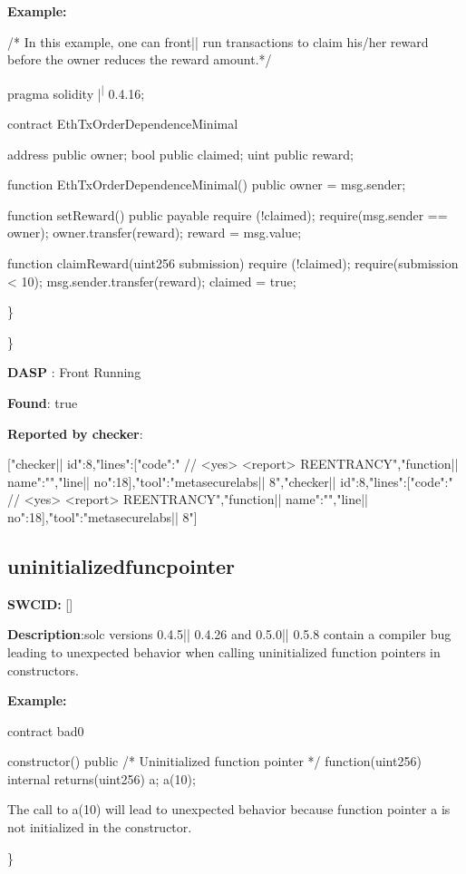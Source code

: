 \documentclass{article}
\begin{document}
\textbf{Example:} 
\begin{ffcode} 

/* In this example, one can front|\textendash| run transactions to claim his/her reward before the owner reduces the reward amount.*/ 

pragma solidity |\textsuperscript| 0.4.16;

contract EthTxOrderDependenceMinimal {
    address public owner;
    bool public claimed;
    uint public reward;

    function EthTxOrderDependenceMinimal() public {
        owner = msg.sender;
    }

    function setReward() public payable {
        require (!claimed);
        require(msg.sender == owner);
        owner.transfer(reward);
        reward = msg.value;
    }

    function claimReward(uint256 submission) {
        require (!claimed);
        require(submission < 10);
        msg.sender.transfer(reward);
        claimed = true;
    }
}

\end{ffcode} 
\} 

\} 

\textbf{DASP} : Front Running

\textbf{Found}: true

\textbf{Reported by checker}: 
\begin{ffcode} 

[{"checker|\textunderscore| id":8,"lines":[{"code":"      // <yes> <report> REENTRANCY\n","function|\textunderscore| name":"","line|\textunderscore| no":18}],"tool":"metasecurelabs|\textendash| 8"},{"checker|\textunderscore| id":8,"lines":[{"code":"      // <yes> <report> REENTRANCY\n","function|\textunderscore| name":"","line|\textunderscore| no":18}],"tool":"metasecurelabs|\textendash| 8"}]
\end{ffcode} 
\subsection{uninitialized{\textunderscore}func{\textunderscore}pointer} 
\textbf{SWC{\textunderscore}ID:} []

\textbf{Description}:solc versions 0.4.5|\textendash| 0.4.26 and 0.5.0|\textendash| 0.5.8 contain a compiler bug leading to unexpected behavior when calling uninitialized function pointers in constructors.


\textbf{Example:} 
\begin{ffcode} 

contract bad0 {

  constructor() public {
    /* Uninitialized function pointer */
    function(uint256) internal returns(uint256) a;
    a(10);
  }
}

The call to a(10) will lead to unexpected behavior because function pointer a is not initialized in the constructor.

\end{ffcode} 
\} 
\end{document}
